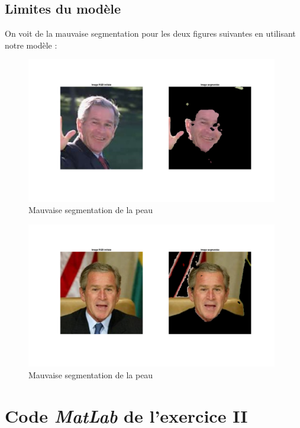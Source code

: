\documentclass[11pt,a4paper]{article}
\begin{document}
\subsection{Limites du modèle}
\label{an.lim}
On voit de la mauvaise segmentation pour les deux figures suivantes en utilisant notre modèle :

\begin{figure}[H]
\center
\includegraphics[width=11cm]{exo2_image_seg_limit1.png}
\caption{Mauvaise segmentation de la peau}
\end{figure} 

\begin{figure}[H]
\center
\includegraphics[width=11cm]{exo2_image_seg_limit2.png}
\caption{Mauvaise segmentation de la peau}
\end{figure} 

\newpage
\section{Code \emph{MatLab} de l'exercice II}
\end{document}
